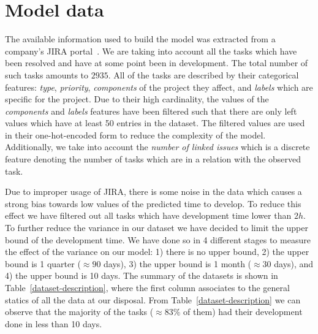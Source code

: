 \documentclass[conference,compsoc]{IEEEtran}
\begin{document}


\section{Model data}
The available information used to build the model was extracted from a company's JIRA portal~\cite{JIRA}. We are taking into account all the tasks which have been resolved and have at some point been in development. The total number of such tasks amounts to $2935$. All of the tasks are described by their categorical features: \textit{type}, \textit{priority}, \textit{components} of the project they affect, and \textit{labels} which are specific for the project. Due to their high cardinality, the values of the \textit{components} and \textit{labels} features have been filtered such that there are only left values which have at least 50 entries in the dataset. The filtered values are used in their one-hot-encoded form to reduce the complexity of the model. Additionally, we take into account the \textit{number of linked issues} which is a discrete feature denoting the number of tasks which are in a relation with the observed task.

Due to improper usage of JIRA, there is some noise in the data which causes a strong bias towards low values of the predicted time to develop. To reduce this effect we have filtered out all tasks which have development time lower than $2h$. To further reduce the variance in our dataset we have decided to limit the upper bound of the development time. We have done so in 4 different stages to measure the effect of the variance on our model: 1) there is no upper bound, 2) the upper bound is 1 quarter ($\approx 90$ days), 3) the upper bound is 1 month ($\approx 30$ days), and 4) the upper bound is 10 days. The summary of the datasets is shown in Table~\ref{dataset-description}, where the first column associates to the general statics of all the data at our disposal. From Table~\ref{dataset-description} we can observe that the majority of the tasks ($\approx 83\%$ of them) had their development done in less than 10 days.
\end{document}
